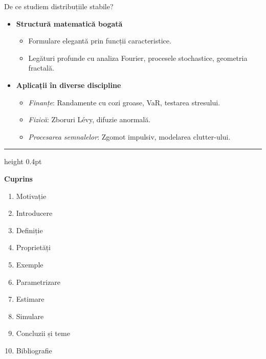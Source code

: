 \documentclass[9pt, aspectratio=169, t]{beamer}
\theoremstyle{definition}
\begin{document}
\begin{frame}{De ce studiem distribuțiile stabile?}
\begin{itemize}
    \item \textbf{Structură matematică bogată}
    \begin{itemize}
        \item Formulare elegantă prin funcții caracteristice.
        \item Legături profunde cu analiza Fourier, procesele stochastice, geometria fractală.
    \end{itemize}
    \item \textbf{Aplicații în diverse discipline}
    \begin{itemize}
        \item \textit{Finanțe}: Randamente cu cozi groase, VaR, testarea stresului.
        \item \textit{Fizică}: Zboruri L\'{e}vy, difuzie anormală.
        \item \textit{Procesarea semnalelor}: Zgomot impulsiv, modelarea clutter-ului.
    \end{itemize}
\end{itemize}
\end{frame}

{
\begin{frame}{}
    {\color{FooterGray}\hrule height 0.4pt}

    \vspace{0.3cm}

    {\Large\textcolor{IDAred}{\textbf{Cuprins}}}

    \vspace{0.4cm}

    \begin{enumerate}
        \item Motivație \checkmark
        \item Introducere
        \item Definiție
        \item Proprietăți
        \item Exemple
        \item Parametrizare
        \item Estimare
        \item Simulare
        \item Concluzii și teme
        \item Bibliografie
    \end{enumerate}
\end{frame}
}
\end{document}
